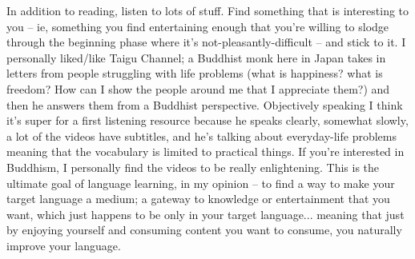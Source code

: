In addition to reading, listen to lots of stuff. Find something that is interesting to you -- ie, something you find entertaining enough that you're willing to slodge through the beginning phase where it's not-pleasantly-difficult -- and stick to it. I personally liked/like Taigu Channel; a Buddhist monk here in Japan takes in letters from people struggling with life problems (what is happiness? what is freedom? How can I show the people around me that I appreciate them?) and then he answers them from a Buddhist perspective. Objectively speaking I think it's super for a first listening resource because he speaks clearly, somewhat slowly, a lot of the videos have subtitles, and he's talking about everyday-life problems meaning that the vocabulary is limited to practical things. If you're interested in Buddhism, I personally find the videos to be really enlightening. This is the ultimate goal of language learning, in my opinion -- to find a way to make your target language a medium; a gateway to knowledge or entertainment that you want, which just happens to be only in your target language... meaning that just by enjoying yourself and consuming content you want to consume, you naturally improve your language.

